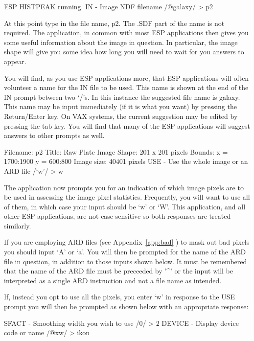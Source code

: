 \documentclass[twoside,11pt]{starlink}
\begin{document}
\begin{terminalv}

ESP HISTPEAK running.
IN - Image NDF filename /@galaxy/ > p2
\end{terminalv}

At this point type in the file name, p2. The .SDF part of the name is
not required. The application, in common with most ESP applications
then gives you some useful information about the image in question.
In particular, the image shape will give you some idea how long you will
need to wait for you answers to appear.

You will find, as you use ESP applications more, that ESP applications will
often volunteer a name for the IN file to be used. This name is shown at the
end of the IN  prompt between two `/'s. In this instance the suggested file
name is galaxy. This name may be input
immediately (if it is what you want) by pressing the Return/Enter
key. On VAX systems, the current suggestion may be edited by pressing the tab
key. You will find that many of the ESP applications will suggest answers to
other prompts as well.

\begin{terminalv}
Filename:   p2
Title:      Raw Plate Image
Shape:      201 x 201  pixels
Bounds:     x = 1700:1900  y = 600:800
Image size: 40401 pixels
USE - Use the whole image or an ARD file /`w'/ > w
\end{terminalv}

The application now prompts you for an indication of which image pixels are
to be used in assessing the image pixel statistics. Frequently, you
will want to use all of
them, in which case your input should be `w' or `W'. This application,
and all other ESP applications,
are not case sensitive so both responses are treated similarly.

If you are employing ARD files (see Appendix~\ref{app:bad} ) to mask out bad
pixels you should input `A' or `a'.
You will then be
prompted for the name of the ARD file in question, in addition to those
inputs shown below. It must be remembered that the name of the ARD file
must be preceeded by '\^{ }' or the input will be interpreted as a single
ARD instruction and
not a file name as intended.

If, instead you opt to use all the pixels, you enter `w' in response to the
USE prompt you will then be prompted as shown below with an appropriate
response:

\begin{terminalv}
SFACT - Smoothing width you wish to use /0/ > 2
DEVICE - Display device code or name /@xw/ > ikon
\end{terminalv}
\end{document}

